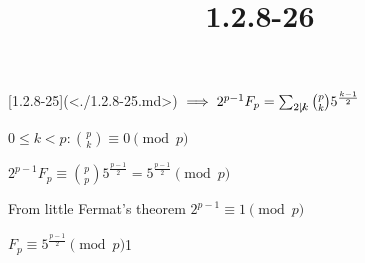 \documentclass{article}
\title{1.2.8-26}
\begin{document}
\maketitle

[1.2.8-25](<./1.2.8-25.md>) \( \implies 2^{p-1}F_p = \sum_{2 \not\mid k} \binom{p}{k}5^{\frac{k-1}{2}} \)

\( 0 \leq k < p: \binom{p}{k} \equiv 0 \pmod p \)

\( 2^{p-1}F_p \equiv \binom{p}{p}5^{\frac{p-1}{2}} = 5^{\frac{p-1}{2}} \pmod p \)

From little Fermat's theorem \( 2^{p-1} \equiv 1 \pmod p \)

\( F_p \equiv 5^{\frac{p-1}{2}} \pmod p \)1
\end{document}
